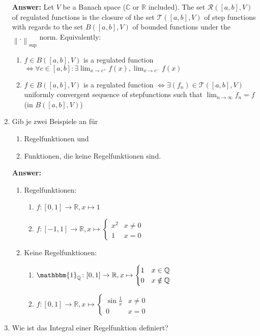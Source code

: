 \documentclass[11pt]{article}
\newcommand{\norm}[1]{\left\lVert#1\right\rVert}
\newcommand{\RR}[0]{\mathbb{R}}
\newcommand{\CC}[0]{\mathbb{C}}
\newcommand{\QQ}[0]{\mathbb{Q}}
\begin{document}
\begin{enumerate}
    \textbf{Answer:}
    Let $V$ be a Banach space ($\CC$ or $\RR$ included). The set $\mathcal{R}([a, b], V)$ of regulated functions is the closure of the set $\mathcal{T}([a, b], V)$ of step functions with regards to the set $B([a, b], V)$ of bounded functions under the $\norm{.}_{\sup}$ norm. Equivalently: \begin{enumerate}
    \item $f \in B([a, b], V)$ is a regulated function $\Leftrightarrow \forall c \in [a, b]\colon \exists \lim_{x\to c^+} f(x), \lim_{x\to c^-} f(x)$
    \item $f \in B([a, b], V)$ is a regulated function $\Leftrightarrow \exists (f_n) \in \mathcal{T}([a, b], V)$ uniformly convergent sequence of stepfunctions such that $\lim_{n \to \infty} f_n = f$ (in $B([a, b], V)$)
    \end{enumerate}

    \item Gib je zwei Beispiele an für
    \begin{enumerate}
        \item Regelfunktionen und
        \item Funktionen, die keine Regelfunktionen sind.
    \end{enumerate}

    \textbf{Answer:}
    \begin{enumerate}
        \item Regelfunktionen:\begin{enumerate}
            \item $f: [0, 1] \to \mathbb{R}, x \mapsto 1$
            \item $f: [-1, 1] \to \mathbb{R}, x \mapsto \begin{cases}
                x^2&x\neq0\\
                1&x=0
            \end{cases}$
        \end{enumerate}

        \item Keine Regelfunktionen:\begin{enumerate}
            \item $\mathbbm{1}_\QQ\colon [0, 1] \to \RR, x \mapsto \begin{cases}
                1&x\in\QQ\\
                0&x\notin\QQ
            \end{cases}$
            \item $f\colon [0, 1]\to \RR, x \mapsto \begin{cases}
                \sin{\frac{1}{x}}&x\neq 0\\
                0&x = 0
            \end{cases}$
        \end{enumerate}
    \end{enumerate}
    \item Wie ist das Integral einer Regelfunktion definiert?


\end{enumerate}
\end{document}
